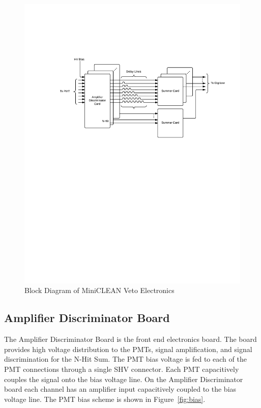 \documentclass[preprint,12pt]{elsarticle}
\begin{document}
\begin{figure}[h]
\begin{center}
\includegraphics[width=5in, keepaspectratio=true, trim=1.25in 5.75in 0.5in 2in, clip=true]{graphics/block}
\caption{Block Diagram of MiniCLEAN Veto Electronics}
\label{fig:block_diagram}
\end{center}
\end{figure}

\subsection{Amplifier Discriminator Board}
\label{sec:Amp-Disc}
%
The Amplifier Discriminator Board is the front end electronics board.
The board provides high voltage distribution to the PMTs, signal
amplification, and signal discrimination for the N-Hit Sum.  The PMT
bias voltage is fed to each of the PMT connections through a single
SHV connector.  Each PMT capacitively couples the signal onto the bias
voltage line.  On the Amplifier Discriminator board each channel has
an amplifier input capacitively coupled to the bias voltage line.  The
PMT bias scheme is shown in Figure~\ref{fig:bias}.
\end{document}
